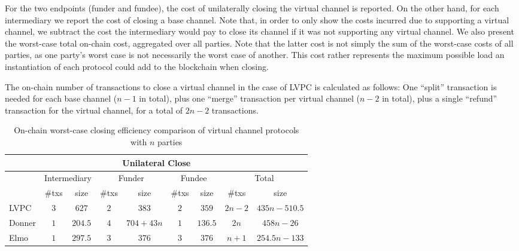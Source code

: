   For the two endpoints (funder and fundee), the cost of unilaterally closing
  the virtual channel is reported. On the other hand, for each intermediary we
  report the cost of closing a base channel. Note that, in order to only show
  the costs incurred due to supporting a virtual channel, we subtract the cost
  the intermediary would pay to close its channel if it was not supporting any
  virtual channel. We also present the worst-case total on-chain cost,
  aggregated over all parties. Note that the latter cost is not simply the sum
  of the worst-case costs of all parties, as one party's worst case is not
  necessarily the worst case of another. This cost rather represents the maximum
  possible load an instantiation of each protocol could add to the blockchain
  when closing.

  The on-chain number of transactions to close a virtual channel in the case of
  LVPC is calculated as follows: One ``split'' transaction is needed for each
  base channel ($n-1$ in total), plus one ``merge'' transaction per virtual
  channel ($n-2$ in total), plus a single ``refund'' transaction for the virtual
  channel, for a total of $2n-2$ transactions.

  \begin{table}[h!]
    \begin{minipage}{\textwidth}
    \centering
    \begin{tabular}{|l|c|c|c|c|c|c|c|c|}
    \hline
    \multicolumn{9}{|c|}{Unilateral Close} \\
    \hline
              & \multicolumn{2}{|c|}{Intermediary}
              & \multicolumn{2}{|c|}{Funder} & \multicolumn{2}{|c|}{Fundee}
              & \multicolumn{2}{|c|}{Total} \\
    \hline
              & \#txs & size & \#txs & size & \#txs & size & \#txs & size \\
    \hline
    LVPC      & $3$ & $627$ & $2$ & $383$ & $2$ & $359$ & $2n-2$ & $435n -
              510.5$ \\
    \hline
    Donner    & $1$ & $204.5$ & $4$ & $704 + 43n$ & $1$ & $136.5$ & $2n$ & $458n
              - 26$ \\
    \hline
    Elmo      & $1$ & $297.5$ & $3$ & $376$ & $3$ & $376$
              & $n+1$ & $254.5n-133$ \\
    \hline
    \end{tabular}
    \end{minipage}
    \caption{On-chain worst-case closing efficiency comparison of virtual
    channel protocols with $n$ parties}
    \label{table:comparison:overhead:n-parties:close}
  \end{table}

